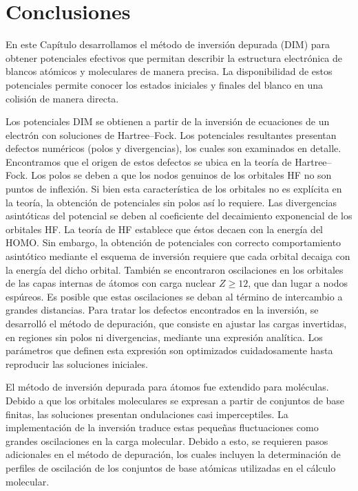 \section{Conclusiones}
\label{conclusion}

En este Capítulo desarrollamos el método de inversión depurada (DIM) 
para obtener potenciales efectivos que permitan describir la estructura 
electrónica de blancos atómicos y moleculares de manera precisa. La 
disponibilidad de estos potenciales permite conocer los estados 
iniciales y finales del blanco en una colisión de manera directa. 

Los potenciales DIM se obtienen a partir de la inversión de ecuaciones 
de un electrón con soluciones de Hartree--Fock. Los potenciales 
resultantes presentan defectos numéricos (polos y divergencias), los 
cuales son examinados en detalle. Encontramos que el origen de estos 
defectos se ubica en la teoría de Hartree--Fock. Los polos se deben a 
que los nodos genuinos de los orbitales HF no son puntos de inflexión. 
Si bien esta característica de los orbitales no es explícita en la 
teoría, la obtención de potenciales sin polos así lo requiere. Las 
divergencias asintóticas del potencial se deben al coeficiente del 
decaimiento exponencial de los orbitales HF. La teoría de HF establece 
que éstos decaen con la energía del HOMO. Sin embargo, la obtención de 
potenciales con correcto comportamiento asintótico mediante el esquema 
de inversión requiere que cada orbital decaiga con la energía del dicho 
orbital. También se encontraron oscilaciones en los orbitales de las 
capas internas de átomos con carga nuclear $Z\ge 12$, que dan lugar a  
nodos espúreos. Es posible que estas oscilaciones se deban al término de 
intercambio a grandes distancias. Para tratar los defectos encontrados 
en la inversión, se desarrolló el método de depuración, que consiste en 
ajustar las cargas invertidas, en regiones sin polos ni divergencias, 
mediante una expresión analítica. Los parámetros que definen esta 
expresión son optimizados cuidadosamente hasta reproducir las soluciones 
iniciales.

El método de inversión depurada para átomos fue extendido para 
moléculas. Debido a que los orbitales moleculares se expresan a partir 
de conjuntos de base finitas, las soluciones presentan ondulaciones casi 
imperceptiles. La implementación de la inversión traduce estas pequeñas 
fluctuaciones como grandes oscilaciones en la carga molecular. Debido a 
esto, se requieren pasos adicionales en el método de depuración, los 
cuales incluyen la determinación de perfiles de oscilación de los 
conjuntos de base atómicas utilizadas en el cálculo molecular. 

